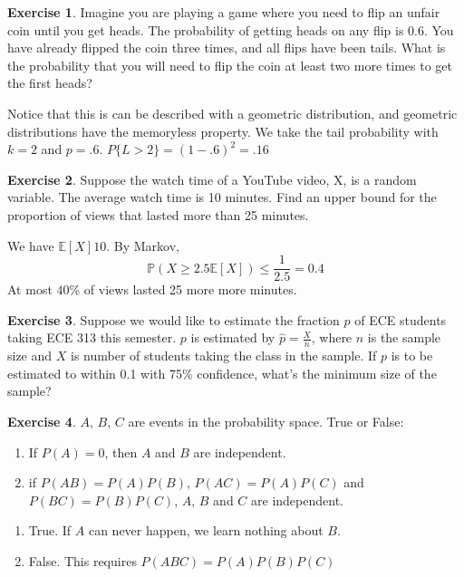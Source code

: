 \documentclass[12pt]{amsart}
\theoremstyle{definition}
\newtheorem{exercise}{Exercise}
\numberwithin{equation}{section}
\theoremstyle{plain}
\newcommand{\E}{\mathbb{E}}
\renewcommand{\P}{\mathbb{P}}
\begin{document}
 

\begin{exercise}
    Imagine you are playing a game where you need to flip an unfair coin until you get heads. The probability of getting heads on any flip is 0.6. You have already flipped the coin three times, and all flips have been tails. What is the probability that you will need to flip the coin at least two more times to get the first heads? %
    \begin{answer}
    Notice that this is can be described with a geometric distribution, and geometric distributions have the memoryless property. We take the tail probability with $k = 2$ and $p = .6$. $P\{L > 2\} = (1 - .6)^2 = .16$
    \end{answer}
\end{exercise}

 

\begin{exercise}
    Suppose the watch time of a YouTube video, X, is a random variable. The average watch time is 10 minutes. Find an upper bound for the proportion of views that lasted more than 25 minutes. %
    \begin{answer}
        We have $\E[X] 10$. By Markov,
        \[
            \P(X \geq 2.5\E[X]) \leq \frac{1}{2.5} = 0.4
        \]
        At most $40\%$ of views lasted 25 more more minutes.
    \end{answer}
\end{exercise}

 

\begin{exercise}
    Suppose we would like to estimate the fraction $p$ of ECE students taking ECE 313 this semester. $p$ is estimated by $\widehat{p}=\frac{X}{n}$, where $n$ is the sample size and $X$ is number of students taking the class in the sample. If $p$ is to be estimated to within 0.1 with 75\% confidence, what’s the minimum size of the sample? %
\end{exercise}

 

\begin{exercise}
    $A$, $B$, $C$ are events in the probability space. True or False:
    \begin{enumerate}[]
        \item If $P(A)=0$, then $A$ and $B$ are independent.
        \item if $P(AB) = P(A)P(B)$, $P(AC) = P(A)P(C)$ and $P(BC) = P(B)P(C)$, $A$, $B$ and $C$ are independent. 
    \end{enumerate}
    \begin{answer}
        \begin{enumerate}
            \item True. If $A$ can never happen, we learn nothing about $B$.
            \item False. This requires $P(ABC) = P(A) P(B) P(C)$
        \end{enumerate}
    \end{answer}
\end{exercise}
\end{document}
